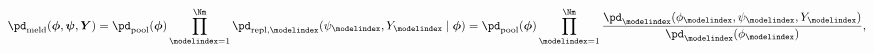 \begin{equation}
  \pd_{\text{meld}}(\boldsymbol{\phi}, \boldsymbol{\psi}, \boldsymbol{Y}) =
    \pd_{\text{pool}}(\boldsymbol{\phi})
    \prod_{\modelindex = 1}^{\Nm}
      \pd_{\text{repl}, \modelindex}(\psi_{\modelindex}, Y_{\modelindex} \mid \boldsymbol{\phi})
    =
    \pd_{\text{pool}}(\boldsymbol{\phi})
    \prod_{\modelindex =1}^{\Nm}
    \frac {
      \pd_{\modelindex}(\phi_{\modelindex}, \psi_{\modelindex}, Y_{\modelindex})
    } {
      \pd_{\modelindex}(\phi_{\modelindex})
    },
  \label{eqn:melded-model-full}
\end{equation}